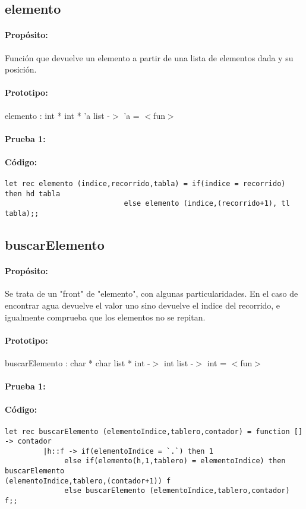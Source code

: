 \subsection{elemento}

\paragraph{Propósito:} Función que devuelve un elemento a partir de una lista de elementos
dada y su posición.
\paragraph{Prototipo:} elemento : int * int * 'a list -$>$ 'a = $<$fun$>$
\paragraph{Prueba 1:}
\paragraph{Código:}
\begin{verbatim}
let rec elemento (indice,recorrido,tabla) = if(indice = recorrido) then hd tabla
				            else elemento (indice,(recorrido+1), tl tabla);;
\end{verbatim}

\subsection{buscarElemento}

\paragraph{Propósito:} Se trata de un "front" de "elemento", con algunas particularidades.
En el caso de encontrar agua devuelve el valor uno sino devuelve el indice del
recorrido, e igualmente comprueba que los elementos no se repitan.
\paragraph{Prototipo:} buscarElemento : char * char list * int -$>$ int list -$>$ int = $<$fun$>$
\paragraph{Prueba 1:}
\paragraph{Código:}
\begin{verbatim}
let rec buscarElemento (elementoIndice,tablero,contador) = function [] -> contador
		 |h::f -> if(elementoIndice = `.`) then 1
			  else if(elemento(h,1,tablero) = elementoIndice) then buscarElemento
(elementoIndice,tablero,(contador+1)) f
			  else buscarElemento (elementoIndice,tablero,contador) f;;
\end{verbatim}

